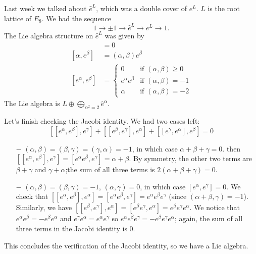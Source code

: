  \setcounter{lecture}{27}

 Last week we talked about $\hat e^L$, which was a double cover of $e^L$. $L$ is the
 root lattice of $E_8$. We had the sequence
 \[
    1\to \pm 1\to \hat e^L\to e^L\to 1.
 \]
 The Lie algebra structure on $\hat e^L$ was given by
 \begin{align*}
 [\alpha, \beta]     &= 0\\
 [\alpha, e^\beta]   &= (\alpha, \beta) e^\beta \\
 [e^\alpha, e^\beta] &= \begin{cases}
                       0 & \text{if $(\alpha, \beta) \ge 0$}\\
                       e^\alpha e^\beta & \text{if $(\alpha, \beta) = -1$}\\
                       \alpha & \text{if $(\alpha, \beta) = -2$}
                     \end{cases}
 \end{align*}
 The Lie algebra is $L\oplus \bigoplus_{\alpha^2=2} \hat e^\alpha$.

 Let's finish checking the Jacobi identity. We had two cases left:
 \[
 [[e^\alpha,e^\beta],e^\gamma] + [[e^\beta,e^\gamma],e^\alpha] + [[e^\gamma,e^\alpha],e^\beta]=0
 \]
 \begin{itemize}
   \item[$-$] $(\alpha,\beta)=(\beta,\gamma)=(\gamma,\alpha)=-1$, in which case
   $\alpha+\beta+\gamma=0$. then $[[e^\alpha,e^\beta],e^\gamma] = [e^\alpha
   e^\beta,e^\gamma] = \alpha+\beta$. By symmetry, the other two terms are
   $\beta+\gamma$ and $\gamma+\alpha$;the sum of all three terms is
   $2(\alpha+\beta+\gamma)=0$.

   \item[$-$] $(\alpha,\beta)=(\beta,\gamma)=-1$, $(\alpha,\gamma)=0$, in which case
   $[e^\alpha,e^\gamma]=0$. We check that $[[e^\alpha,e^\beta],e^\alpha]=[e^\alpha
   e^\beta, e^\gamma] = e^\alpha e^\beta e^\gamma$ (since
   $(\alpha+\beta,\gamma)=-1$).
   Similarly, we have $[[e^\beta,
   e^\gamma],e^\alpha] = [e^\beta e^\gamma,e^\alpha] = e^\beta e^\gamma e^\alpha$.
   We notice that $e^\alpha e^\beta = -e^\beta e^\alpha$
   and $e^\gamma e^\alpha = e^\alpha e^\gamma$ so
   $e^\alpha e^\beta e^\gamma = -e^\beta e^\gamma e^\alpha$; again, the sum
   of all three terms in the Jacobi identity is 0.
 \end{itemize}
 This concludes the verification of the Jacobi identity, so we have a Lie algebra.

